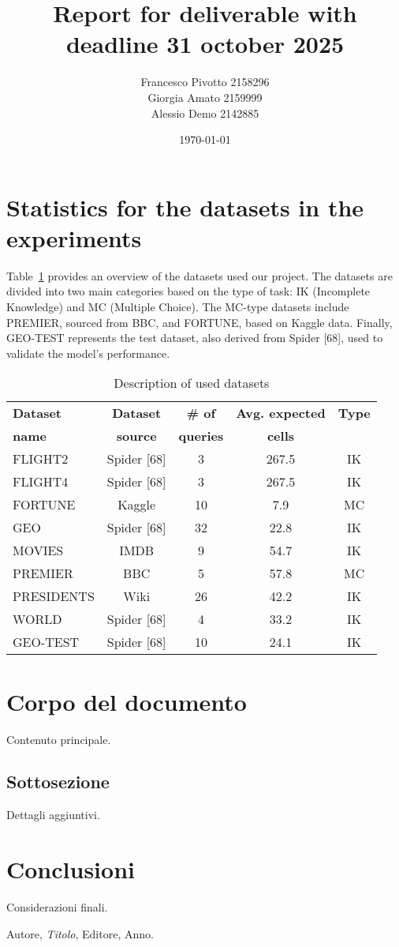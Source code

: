 \documentclass[12pt,a4paper]{article}
\title{Report for deliverable with deadline 31 october 2025}
\author{Francesco Pivotto 2158296\\ Giorgia Amato 2159999\\ Alessio Demo 2142885 }
\date{\today}
\begin{document}
\maketitle

\tableofcontents
\newpage

\section{Statistics for the datasets in the experiments}

Table~\ref{tab:datasets} provides an overview of the datasets used our project. The datasets are divided into two main categories based on the type of task: IK (Incomplete Knowledge) and MC (Multiple Choice).
The MC-type datasets include PREMIER, sourced from BBC, and FORTUNE, based on Kaggle data.
Finally, GEO-TEST represents the test dataset, also derived from Spider [68], used to validate the model's performance.

\begin{table}[h]
\centering
\begin{tabular}{lcccc}
\toprule
\textbf{Dataset} & \textbf{Dataset} & \textbf{\# of} & \textbf{Avg. expected} & \textbf{Type} \\
\textbf{name} & \textbf{source} & \textbf{queries} & \textbf{cells} & \\
\midrule
FLIGHT2 & Spider [68] & 3 & 267.5 & IK \\
FLIGHT4 & Spider [68] & 3 & 267.5 & IK \\
FORTUNE & Kaggle & 10 & 7.9 & MC \\
GEO & Spider [68] & 32 & 22.8 & IK \\
MOVIES & IMDB & 9 & 54.7 & IK \\
PREMIER & BBC & 5 & 57.8 & MC \\
PRESIDENTS & Wiki & 26 & 42.2 & IK \\
WORLD & Spider [68] & 4 & 33.2 & IK \\



\midrule
GEO-TEST & Spider [68] & 10 & 24.1 & IK \\
\bottomrule
\end{tabular}
\caption{Description of used datasets}
\label{tab:datasets}
\end{table}

\section{Corpo del documento}
Contenuto principale.

\subsection{Sottosezione}
Dettagli aggiuntivi.

\section{Conclusioni}
Considerazioni finali.

\begin{thebibliography}{9}
Autore, \emph{Titolo}, Editore, Anno.
\end{thebibliography}
\end{document}
